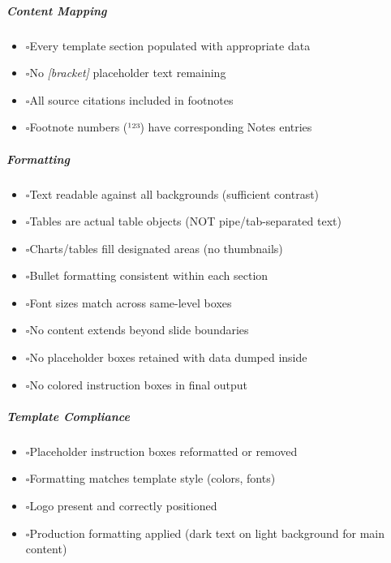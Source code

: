 \documentclass[11pt]{article}
\newcommand{\UncheckedBox}{$\square$}
\begin{document}
\subparagraph{Content Mapping}\mbox{}\par
\begin{itemize}[leftmargin=*,itemsep=2pt,topsep=2pt]
\item {} \UncheckedBox Every template section populated with appropriate data
\item {} \UncheckedBox No \emph{[bracket]} placeholder text remaining
\item {} \UncheckedBox All source citations included in footnotes
\item {} \UncheckedBox Footnote numbers (¹²³) have corresponding Notes entries
\end{itemize}

\subparagraph{Formatting}\mbox{}\par
\begin{itemize}[leftmargin=*,itemsep=2pt,topsep=2pt]
\item {} \UncheckedBox Text readable against all backgrounds (sufficient contrast)
\item {} \UncheckedBox Tables are actual table objects (NOT pipe/tab-separated text)
\item {} \UncheckedBox Charts/tables fill designated areas (no thumbnails)
\item {} \UncheckedBox Bullet formatting consistent within each section
\item {} \UncheckedBox Font sizes match across same-level boxes
\item {} \UncheckedBox No content extends beyond slide boundaries
\item {} \UncheckedBox No placeholder boxes retained with data dumped inside
\item {} \UncheckedBox No colored instruction boxes in final output
\end{itemize}

\subparagraph{Template Compliance}\mbox{}\par
\begin{itemize}[leftmargin=*,itemsep=2pt,topsep=2pt]
\item {} \UncheckedBox Placeholder instruction boxes reformatted or removed
\item {} \UncheckedBox Formatting matches template style (colors, fonts)
\item {} \UncheckedBox Logo present and correctly positioned
\item {} \UncheckedBox Production formatting applied (dark text on light background for main content)
\end{itemize}
\end{document}
